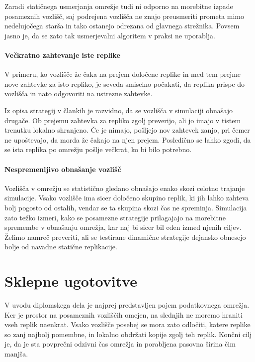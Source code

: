 \documentclass[a4paper, 12pt]{book}
\begin{document}
Zaradi statičnega usmerjanja omrežje tudi ni odporno na morebitne izpade
posameznih vozlišč, saj podrejena vozlišča ne znajo preusmeriti prometa mimo
nedelujočega starša in tako ostanejo odrezana od glavnega strežnika. Povsem
jasno je, da se zato tak usmerjevalni algoritem v praksi ne uporablja.

\subsubsection{Večkratno zahtevanje iste replike}

V primeru, ko vozlišče že čaka na prejem določene replike in med tem prejme nove
zahtevke za isto repliko, je seveda smiselno počakati, da replika prispe do
vozlišča in nato odgovoriti na ustrezne zahtevke.

Iz opisa strategij v člankih je razvidno, da se vozlišča v simulaciji obnašajo
drugače. Ob prejemu zahtevka za repliko zgolj preverijo, ali jo imajo v tistem
trenutku lokalno shranjeno. Če je nimajo, pošljejo nov zahtevek zanjo, pri čemer
ne upoštevajo, da morda že čakajo na njen prejem. Posledično se lahko zgodi,
da se ista replika po omrežju pošlje večkrat, ko bi bilo potrebno.

\subsubsection{Nespremenljivo obnašanje vozlišč}

Vozlišča v omrežju se statistično gledano obnašajo enako skozi celotno trajanje
simulacije. Vsako vozlišče ima sicer določeno skupino replik, ki jih
lahko zahteva bolj pogosto od ostalih, vendar se ta skupina skozi čas ne
spreminja. Simulacija zato težko izmeri, kako se posamezne strategije
prilagajajo na morebitne spremembe v obnašanju omrežja, kar naj bi sicer bil
eden izmed njenih ciljev. Želimo namreč preveriti, ali se testirane dinamične
strategije dejansko obnesejo bolje od navadne statične replikacije.



\chapter{Sklepne ugotovitve}

V uvodu diplomskega dela je najprej predstavljen pojem podatkovnega omre\-žja.
Ker je prostor na posameznih vozliščih omejen, na slednjih ne moremo hraniti
vseh replik naenkrat. Vsako vozlišče posebej se mora zato odločiti, katere
replike so zanj najbolj pomembne, in lokalno obdržati kopije zgolj teh replik.
Končni cilj je, da je sta povprečni odzivni čas omrežja in porabljena pasovna
širina čim manjša.
\end{document}
